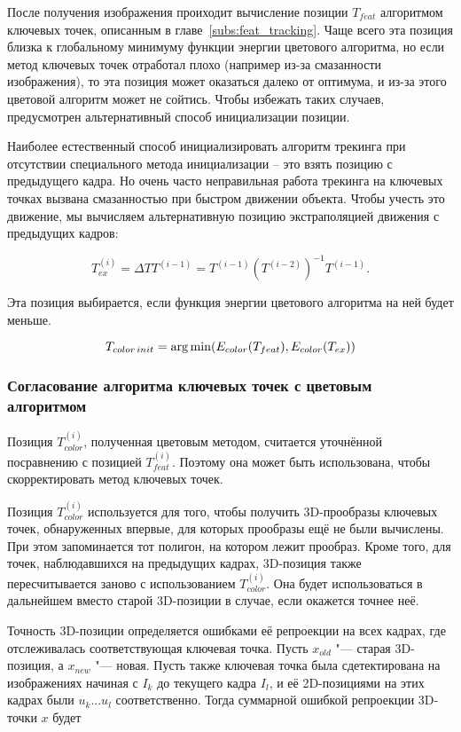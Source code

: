 После получения изображения проиходит вычисление позиции $T_{feat}$ алгоритмом
ключевых точек, описанным в главе~\ref{subs:feat_tracking}.
Чаще всего эта позиция близка к глобальному минимуму функции энергии цветового
алгоритма, но если метод ключевых точек отработал плохо (например из-за
смазанности изображения), то эта позиция может оказаться далеко от оптимума, и
из-за этого цветовой алгоритм может не сойтись.
Чтобы избежать таких случаев, предусмотрен альтернативный способ инициализации
позиции.

Наиболее естественный способ инициализировать алгоритм трекинга при отсутствии
специального метода инициализации -- это взять позицию с предыдущего кадра.
Но очень часто неправильная работа трекинга на ключевых точках вызвана
смазанностью при быстром движении объекта.
Чтобы учесть это движение, мы вычисляем альтернативную позицию экстраполяцией
движения с предыдущих кадров:

\begin{equation}
\label{eqn:extrapolation}
T^{(i)}_{ex} = \Delta T T^{(i - 1)} = T^{(i - 1)}(T^{(i - 2)})^{-1} T^{(i -
1)}
\text{.}
\end{equation}

Эта позиция выбирается, если функция энергии цветового алгоритма на ней будет
меньше.

\begin{equation}
\label{eqn:init_selection}
    T_{color \, init} = \operatorname*{arg\,min}(E_{color}(T_{feat}), E_{color}(T_{ex}))
\end{equation}

\subsubsection*{Согласование алгоритма ключевых точек с цветовым алгоритмом}
Позиция $T_{color}^{(i)}$, полученная цветовым методом, считается уточнённой посравнению с позицией $T_{feat}^{(i)}$.
Поэтому она может быть использована, чтобы скорректировать метод ключевых
точек.

Позиция $T_{color}^{(i)}$ используется для того, чтобы получить 3D-прообразы
ключевых точек, обнаруженных впервые, для которых прообразы ещё не были
вычислены.
При этом запоминается тот полигон, на котором лежит прообраз.
Кроме того, для точек, наблюдавшихся на предыдущих кадрах, 3D-позиция также
пересчитывается заново с использованием $T_{color}^{(i)}$.
Она будет использоваться в дальнейшем вместо старой 3D-позиции в случае, если
окажется точнее неё.

Точность 3D-позиции определяется ошибками её репроекции на всех кадрах, где
отслеживалась соответствующая ключевая точка.
Пусть $x_{old}$ "--- старая 3D-позиция, а $x_{new}$ "--- новая. 
Пусть также ключевая точка была сдетектирована на изображениях начиная с $I_k$
до текущего кадра $I_l$, и её 2D-позициями на этих кадрах были $u_k ... u_l$
соответственно.
Тогда суммарной ошибкой репроекции 3D-точки $x$ будет

